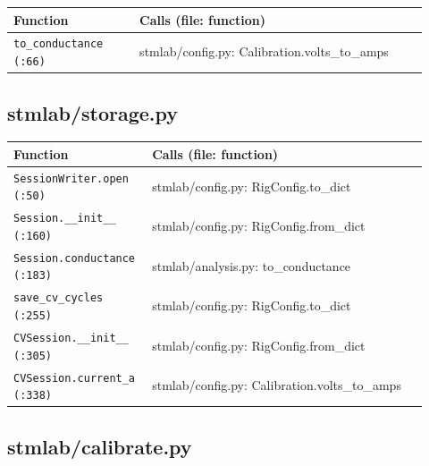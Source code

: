 \small\setlength{\LTleft}{0pt}\setlength{\LTright}{\fill}
\begin{longtable}{@{}>{\raggedright\arraybackslash}p{0.280\linewidth}>{\raggedright\arraybackslash}p{0.640\linewidth}@{}}
\toprule
\textbf{Function} & \textbf{Calls (file: function)} \\
\midrule\endhead
\texttt{to\_\discretionary{}{}{}conductance (:66)} & stmlab/config.py: Calibration.volts\_to\_amps \\
\bottomrule
\end{longtable}
\normalsize

\subsection{stmlab/storage.py}

\small\setlength{\LTleft}{0pt}\setlength{\LTright}{\fill}
\begin{longtable}{@{}>{\raggedright\arraybackslash}p{0.280\linewidth}>{\raggedright\arraybackslash}p{0.640\linewidth}@{}}
\toprule
\textbf{Function} & \textbf{Calls (file: function)} \\
\midrule\endhead
\texttt{Session\discretionary{}{}{}Writer.\discretionary{}{}{}open (:50)} & stmlab/config.py: RigConfig.to\_dict \\
\texttt{Session.\discretionary{}{}{}\_\discretionary{}{}{}\_\discretionary{}{}{}init\_\discretionary{}{}{}\_\discretionary{}{}{} (:160)} & stmlab/config.py: RigConfig.from\_dict \\
\texttt{Session.\discretionary{}{}{}conductance (:183)} & stmlab/analysis.py: to\_conductance \\
\texttt{save\_\discretionary{}{}{}cv\_\discretionary{}{}{}cycles (:255)} & stmlab/config.py: RigConfig.to\_dict \\
\texttt{CVSession.\discretionary{}{}{}\_\discretionary{}{}{}\_\discretionary{}{}{}init\_\discretionary{}{}{}\_\discretionary{}{}{} (:305)} & stmlab/config.py: RigConfig.from\_dict \\
\texttt{CVSession.\discretionary{}{}{}current\_\discretionary{}{}{}a (:338)} & stmlab/config.py: Calibration.volts\_to\_amps \\
\bottomrule
\end{longtable}
\normalsize

\subsection{stmlab/calibrate.py}

